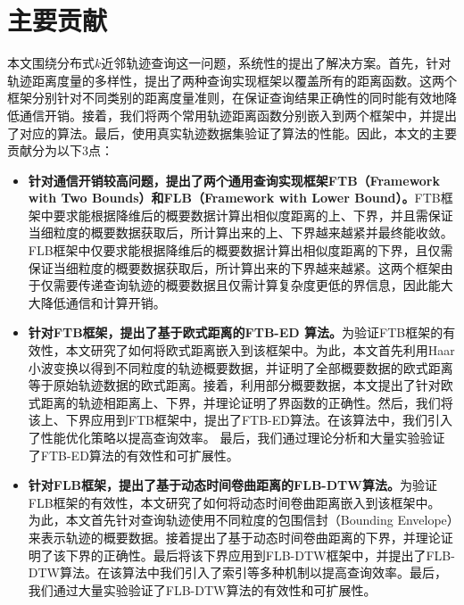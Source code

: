\section{主要贡献}\label{sec-c1-contribution}
本文围绕分布式$k$近邻轨迹查询这一问题，系统性的提出了解决方案。首先，针对轨迹距离度量的多样性，提出了两种查询实现框架以覆盖所有的距离函数。这两个框架分别针对不同类别的距离度量准则，在保证查询结果正确性的同时能有效地降低通信开销。接着，我们将两个常用轨迹距离函数分别嵌入到两个框架中，并提出了对应的算法。最后，使用真实轨迹数据集验证了算法的性能。因此，本文的主要贡献分为以下3点：
\begin{itemize}
	\item  \textbf{针对通信开销较高问题，提出了两个通用查询实现框架FTB（Framework with Two Bounds）和FLB（Framework with Lower Bound）。}FTB框架中要求能根据降维后的概要数据计算出相似度距离的上、下界，并且需保证当细粒度的概要数据获取后，所计算出来的上、下界越来越紧并最终能收敛。FLB框架中仅要求能根据降维后的概要数据计算出相似度距离的下界，且仅需保证当细粒度的概要数据获取后，所计算出来的下界越来越紧。这两个框架由于仅需要传递查询轨迹的概要数据且仅需计算复杂度更低的界信息，因此能大大降低通信和计算开销。
	
	\item \textbf{针对FTB框架，提出了基于欧式距离的FTB-ED 算法。}为验证FTB框架的有效性，本文研究了如何将欧式距离嵌入到该框架中。为此，本文首先利用Haar小波变换以得到不同粒度的轨迹概要数据，并证明了全部概要数据的欧式距离等于原始轨迹数据的欧式距离。接着，利用部分概要数据，本文提出了针对欧式距离的轨迹相距离上、下界，并理论证明了界函数的正确性。然后，我们将该上、下界应用到FTB框架中，提出了FTB-ED算法。在该算法中，我们引入了性能优化策略以提高查询效率。
	最后，我们通过理论分析和大量实验验证了FTB-ED算法的有效性和可扩展性。
	
	\item  \textbf{针对FLB框架，提出了基于动态时间卷曲距离的FLB-DTW算法。}为验证FLB框架的有效性，本文研究了如何将动态时间卷曲距离嵌入到该框架中。
	为此，本文首先针对查询轨迹使用不同粒度的包围信封（Bounding Envelope）来表示轨迹的概要数据。接着提出了基于动态时间卷曲距离的下界，并理论证明了该下界的正确性。最后将该下界应用到FLB-DTW框架中，并提出了FLB-DTW算法。在该算法中我们引入了索引等多种机制以提高查询效率。最后，我们通过大量实验验证了FLB-DTW算法的有效性和可扩展性。
	
\end{itemize}


